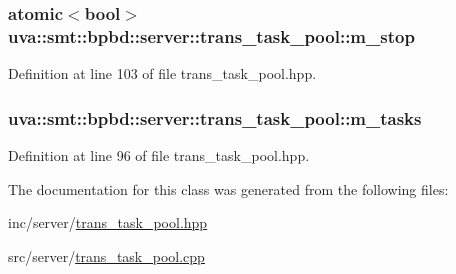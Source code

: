 \subsubsection[{m\+\_\+stop}]{\setlength{\rightskip}{0pt plus 5cm}atomic$<$bool$>$ uva\+::smt\+::bpbd\+::server\+::trans\+\_\+task\+\_\+pool\+::m\+\_\+stop\hspace{0.3cm}{\ttfamily [protected]}}\label{classuva_1_1smt_1_1bpbd_1_1server_1_1trans__task__pool_a60febff93f48cda3adba96429692660e}


Definition at line 103 of file trans\+\_\+task\+\_\+pool.\+hpp.

\hypertarget{classuva_1_1smt_1_1bpbd_1_1server_1_1trans__task__pool_a5d7745f1dc249cfb29fa382fbb66d25f}{}
\subsubsection[{m\+\_\+tasks}]{ uva\+::smt\+::bpbd\+::server\+::trans\+\_\+task\+\_\+pool\+::m\+\_\+tasks\hspace{0.3cm}{\ttfamily [protected]}}\label{classuva_1_1smt_1_1bpbd_1_1server_1_1trans__task__pool_a5d7745f1dc249cfb29fa382fbb66d25f}


Definition at line 96 of file trans\+\_\+task\+\_\+pool.\+hpp.



The documentation for this class was generated from the following files\+:\begin{DoxyCompactItemize}
\item 
inc/server/\hyperlink{trans__task__pool_8hpp}{trans\+\_\+task\+\_\+pool.\+hpp}\item 
src/server/\hyperlink{trans__task__pool_8cpp}{trans\+\_\+task\+\_\+pool.\+cpp}\end{DoxyCompactItemize}
